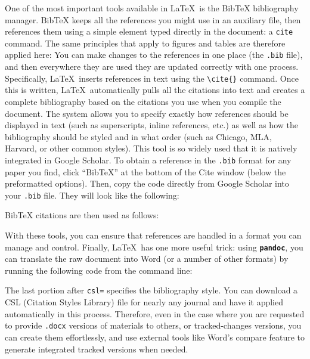 One of the most important tools available in \LaTeX\ is the BibTeX bibliography manager.
BibTeX keeps all the references you might use in an auxiliary file,
then references them using a simple element typed directly in the document: a \texttt{cite} command.
The same principles that apply to figures and tables are therefore applied here:
You can make changes to the references in one place (the \texttt{.bib} file),
and then everywhere they are used they are updated correctly with one process.
Specifically, \LaTeX\ inserts references in text using the \texttt{\textbackslash cite\{\}} command.
Once this is written, \LaTeX\ automatically pulls all the citations into text
and creates a complete bibliography based on the citations you use when you compile the document.
The system allows you to specify exactly how references should be displayed in text
(such as superscripts, inline references, etc.)
as well as how the bibliography should be styled and in what order
(such as Chicago, MLA, Harvard, or other common styles).
This tool is so widely used that it is natively integrated in Google Scholar.
To obtain a reference in the \texttt{.bib} format for any paper you find,
click ``BibTeX'' at the bottom of the Cite window (below the preformatted options).
Then, copy the code directly from Google Scholar into your \texttt{.bib} file.
They will look like the following:


\noindent BibTeX citations are then used as follows:


With these tools, you can ensure that references are handled
in a format you can manage and control.\cite{flom2005latex}
Finally, \LaTeX\ has one more useful trick:
using \textbf{\texttt{pandoc}},
you can translate the raw document into Word
(or a number of other formats)
by running the following code from the command line:


\noindent The last portion after \texttt{csl=} specifies the bibliography style.
You can download a CSL (Citation Styles Library) file
for nearly any journal and have it applied automatically in this process.
Therefore, even in the case where you are requested to provide
\texttt{.docx} versions of materials to others, or tracked-changes versions,
you can create them effortlessly,
and use external tools like Word's compare feature
to generate integrated tracked versions when needed.

